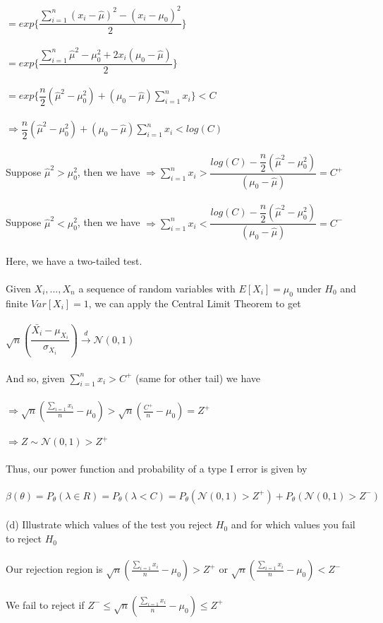 \documentclass{article}
\begin{document}
$=exp\{\dfrac{\sum_{i=1}^n(x_i-\hat{\mu})^2-(x_i-\mu_0)^2}{2}\}$\\\\
$=exp\{\dfrac{\sum_{i=1}^n\hat{\mu}^2-\mu_0^2+2x_i(\mu_0-\hat{\mu})}{2}\}$\\\\
$=exp\{\dfrac{n}{2}(\hat{\mu}^2-\mu_0^2)+(\mu_0-\hat{\mu})\sum_{i=1}^nx_i\}<C$\\\\
$\Rightarrow\dfrac{n}{2}(\hat{\mu}^2-\mu_0^2)+(\mu_0-\hat{\mu})\sum_{i=1}^nx_i<log(C)$\\\\
Suppose $\hat{\mu}^2>\mu_0^2$, then we have
$\Rightarrow\sum_{i=1}^nx_i>\dfrac{log(C)-\dfrac{n}{2}(\hat{\mu}^2-\mu_0^2)}{(\mu_0-\hat{\mu})}=C^+$\\\\
Suppose $\hat{\mu}^2<\mu_0^2$, then we have
$\Rightarrow\sum_{i=1}^nx_i<\dfrac{log(C)-\dfrac{n}{2}(\hat{\mu}^2-\mu_0^2)}{(\mu_0-\hat{\mu})}=C^-$\\\\
Here, we have a two-tailed test.\\\\
Given $X_i,...,X_n$ a sequence of random variables with $E[X_i]=\mu_0$ under $H_0$ and finite $Var[X_i]=1$, we can apply the Central Limit Theorem to get\\\\
$\sqrt{n}(\dfrac{\bar{X_i}-\mu_{X_i}}{\sigma_{X_i}})\xrightarrow{d}\mathcal{N}(0,1)$\\\\
And so, given $\sum_{i=1}^nx_i>C^+$ (same for other tail) we have \\\\
$\Rightarrow \sqrt{n}(\frac{\sum_{i=1}x_i}{n}-\mu_0)>\sqrt{n}(\frac{C^+}{n}-\mu_0)=Z^+$\\\\
$\Rightarrow Z\sim\mathcal{N}(0,1)>Z^+$\\\\
Thus, our power function and probability of a type I error is given by\\\\
$\beta(\theta)=P_\theta(\lambda\in R)=P_\theta(\lambda<C)=P_\theta(\mathcal{N}(0,1)>Z^+)+P_\theta(\mathcal{N}(0,1)>Z^-)$\\\\
(d) Illustrate which values of the test you reject $H_0$ and for which values you fail to reject $H_0$\\\\
Our rejection region is $\sqrt{n}(\frac{\sum_{i=1}x_i}{n}-\mu_0)>Z^+$ or $\sqrt{n}(\frac{\sum_{i=1}x_i}{n}-\mu_0)<Z^-$\\\\
We fail to reject if $Z^-\leq\sqrt{n}(\frac{\sum_{i=1}x_i}{n}-\mu_0)\leq Z^+$
\pagebreak
\end{document}

